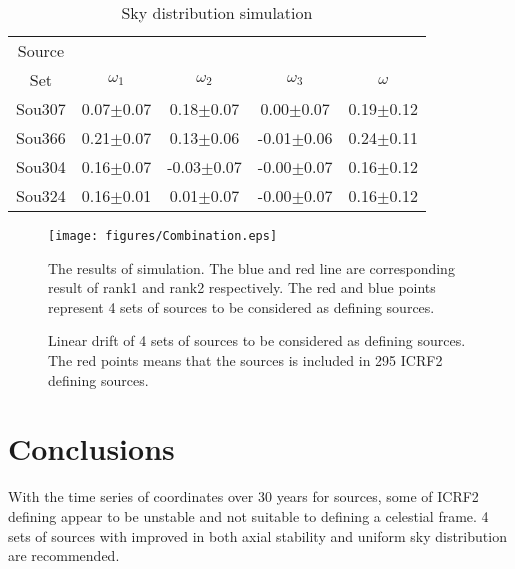 \documentclass{aa}
\begin{document}
	\begin{table}
	\caption{Sky distribution simulation}
	\label{Tab:Sim}
	\centering
	\begin{tabular}{ccccc}
\hline\hline
Source &               &               &               &\\
Set    &$\omega_1$     &$\omega_2$     &$\omega_3$     &$\omega$  \\
Sou307 &0.07$\pm$0.07 & 0.18$\pm$0.07 & 0.00$\pm$0.07 &0.19$\pm$0.12 \\
Sou366 &0.21$\pm$0.07 & 0.13$\pm$0.06 &-0.01$\pm$0.06 &0.24$\pm$0.11 \\
Sou304 &0.16$\pm$0.07 &-0.03$\pm$0.07 &-0.00$\pm$0.07 &0.16$\pm$0.12 \\
Sou324 &0.16$\pm$0.01 & 0.01$\pm$0.07 &-0.00$\pm$0.07 &0.16$\pm$0.12 \\
\hline
	\end{tabular}
	\end{table}

	\begin{figure}
   \centering
   \texttt{[image: figures/Combination.eps]}
      \caption{
      The results of simulation. The blue and red line are corresponding result of rank1 and rank2 respectively. The red and blue points represent 4 sets of sources to be considered as defining sources.
              }
         \label{Fig:com_num}
   \end{figure}
   
   \begin{figure*}
   \centering
      \caption{
      Linear drift of 4 sets of sources to be considered as defining sources. The red points means that the sources is included in 295 ICRF2 defining sources.
              }
         \label{Fig:Liner_drift_4}
   \end{figure*}
\section{Conclusions}\label{sect:conclusion}
With the time series of coordinates over 30 years for sources, some of ICRF2 defining appear to be unstable and not suitable to defining a celestial frame. 4 sets of sources with improved in both axial stability and uniform sky distribution are recommended.

\begin{acknowledgements}
      
\end{acknowledgements}


%

\end{document}
